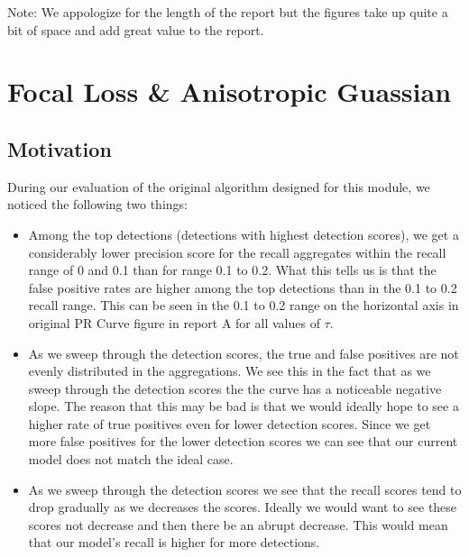 \documentclass[letter]{article}
\newcommand{\setheader}[6]{
	\lhead{{\sc #1} {\sc #2}\\{} ({\small \it \today})}
	\rhead{
		{\bf #3} 
		\ifthenelse{\equal{#4}{}}{}{(#4)}\\
		{\bf #5}
		\ifthenelse{\equal{#6}{}}{}{(#6)}%
	}
}
\begin{document}
	\setheader{CSC490}{Module 1}{Ben Weisz}{}{Qiwen Hua}{}

	Note: We appologize for the length of the report but the figures take up quite a bit of space and add great value to the report.
	\section{Focal Loss \& Anisotropic Guassian}

	\subsection{Motivation}
	During our evaluation of the original algorithm designed for this module, we noticed the following two things:
	\begin{itemize}
		\item Among the top detections (detections with highest detection scores), we get a considerably lower precision score for the recall aggregates within the recall range of 0 and 0.1 than for range 0.1 to 0.2. What this tells us is that the false positive rates are higher among the top detections than in the 0.1 to 0.2 recall range. This can be seen in the 0.1 to 0.2 range on the horizontal axis in original PR Curve figure in report A for all values of $\tau$.
		\item As we sweep through the detection scores, the true and false positives are not evenly distributed in the aggregations. We see this in the fact that as we sweep through the detection scores the the curve has a noticeable negative slope. The reason that this may be bad is that we would ideally hope to see a higher rate of true positives even for lower detection scores. Since we get more false positives for the lower detection scores we can see that our current model does not match the ideal case.
		\item As we sweep through the detection scores we see that the recall scores tend to drop gradually as we decreases the scores. Ideally we would want to see these scores not decrease and then there be an abrupt decrease. This would mean that our model's recall is higher for more detections.
	\end{itemize}
\end{document}
